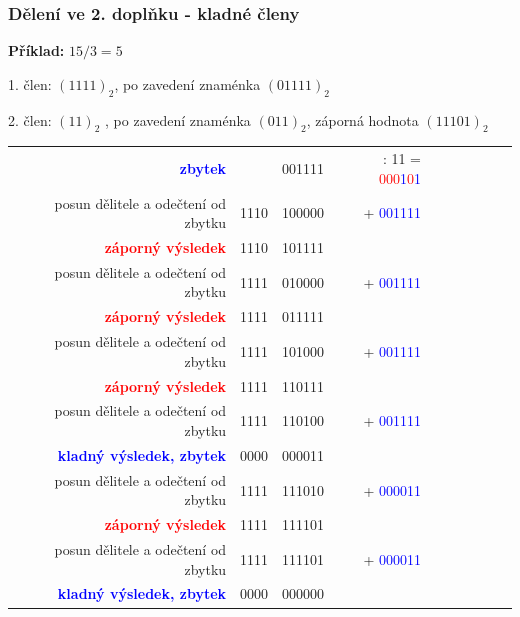   \begin{frame}
    \frametitle{Dělení ve 2. doplňku - kladné členy}
    \boldmath
    \small
    \textbf{Příklad:} $15 / 3 = 5$
    
      1. člen: $(1111)_{2}$, po zavedení znaménka $(01111)_{2}$
      
      2. člen: $(11)_{2}$ , po zavedení znaménka $(011)_{2}$, záporná hodnota $(11101)_{2}$
      
      \vspace{3mm}
      \begin{center}
        \begin{tabular}{r || r | r r r r r r r r}
         \textcolor{blue}{\textbf{zbytek}} & & 001111 & : 11 =  \textcolor{red}{000}\textcolor{blue}{1}\textcolor{red}{0}\textcolor{blue}{1} \\
         posun dělitele a odečtení od zbytku & 1110 & 100000 & + \textcolor{blue}{001111}\\
          \hline
          \textcolor{red}{\textbf{záporný výsledek}} & 1110 & 101111 & \\
          posun dělitele a odečtení od zbytku & 1111 & 010000 & + \textcolor{blue}{001111}\\
          \hline
          \textcolor{red}{\textbf{záporný výsledek}} & 1111 & 011111 & \\
          posun dělitele a odečtení od zbytku & 1111 & 101000 & + \textcolor{blue}{001111}\\
          \hline
          \textcolor{red}{\textbf{záporný výsledek}} & 1111 & 110111 & \\
          posun dělitele a odečtení od zbytku & 1111 & 110100 & + \textcolor{blue}{001111}\\
          \hline
          \textcolor{blue}{\textbf{kladný výsledek, zbytek}} & 0000 & 000011 & \\
          posun dělitele a odečtení od zbytku & 1111 & 111010 & + \textcolor{blue}{000011}\\
          \hline
          \textcolor{red}{\textbf{záporný výsledek}} & 1111 & 111101 & \\
          posun dělitele a odečtení od zbytku & 1111 & 111101 & + \textcolor{blue}{000011}\\
          \hline
          \textcolor{blue}{\textbf{kladný výsledek, zbytek}} & 0000 & 000000 & \\
        \end{tabular}
      \end{center}
    
	\end{frame}